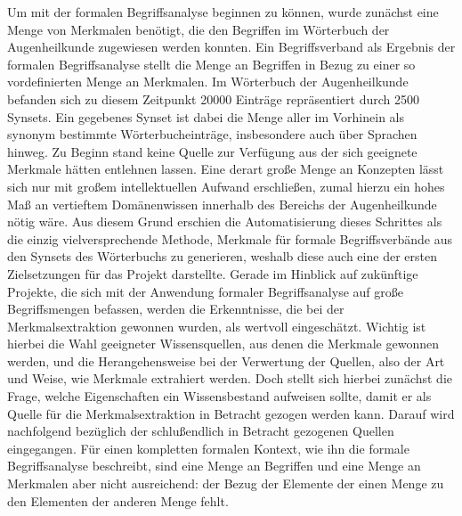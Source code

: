 \documentclass[pagesize,DIV=calc,12pt,draft]{scrreprt}
\begin{document}
Um mit der formalen Begriffsanalyse beginnen zu können, wurde zunächst eine Menge von Merkmalen benötigt, die den Begriffen im Wörterbuch der Augenheilkunde zugewiesen werden konnten. 
Ein Begriffsverband als Ergebnis der formalen Begriffsanalyse stellt die Menge an Begriffen in Bezug zu einer so vordefinierten Menge an Merkmalen. 
Im Wörterbuch der Augenheilkunde befanden sich zu diesem Zeitpunkt 20000 Einträge repräsentiert durch 2500 Synsets. 
Ein gegebenes Synset ist dabei die Menge aller im Vorhinein als synonym bestimmte Wörterbucheinträge, insbesondere auch über Sprachen hinweg. 
Zu Beginn stand keine Quelle zur Verfügung aus der sich geeignete Merkmale hätten entlehnen lassen. 
Eine derart große Menge an Konzepten lässt sich nur mit großem intellektuellen Aufwand erschließen, zumal hierzu ein hohes Maß an vertieftem Domänenwissen innerhalb des Bereichs der Augenheilkunde nötig wäre. 
Aus diesem Grund erschien die Automatisierung dieses Schrittes als die einzig vielversprechende Methode, Merkmale für formale Begriffsverbände aus den Synsets des Wörterbuchs zu generieren, weshalb diese auch eine der ersten Zielsetzungen für das Projekt darstellte. 
Gerade im Hinblick auf zukünftige Projekte, die sich mit der Anwendung formaler Begriffsanalyse auf große Begriffsmengen befassen, werden die Erkenntnisse, die bei der Merkmalsextraktion gewonnen wurden, als wertvoll eingeschätzt. 
Wichtig ist hierbei die Wahl geeigneter Wissensquellen, aus denen die Merkmale gewonnen werden, und die Herangehensweise bei der Verwertung der Quellen, also der Art und Weise, wie Merkmale extrahiert werden. 
Doch stellt sich hierbei zunächst die Frage, welche Eigenschaften ein Wissensbestand aufweisen sollte, damit er als Quelle für die Merkmalsextraktion in Betracht gezogen werden kann. 
Darauf wird nachfolgend bezüglich der schlußendlich in Betracht gezogenen Quellen eingegangen. 
Für einen kompletten formalen Kontext, wie ihn die formale Begriffsanalyse beschreibt, sind eine Menge an Begriffen und eine Menge an Merkmalen aber nicht ausreichend: der Bezug der Elemente der einen Menge zu den Elementen der anderen Menge fehlt.  
\end{document}
